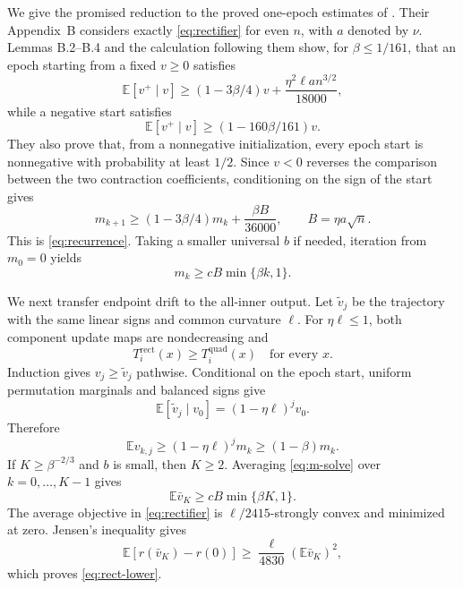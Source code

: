 \documentclass{article}
\theoremstyle{remark}
\newcommand{\E}{\mathbb E}
\newcommand{\1}{\mathbf 1}
\begin{document}
We give the promised reduction to the proved one-epoch estimates of \citet{cha2023tighter}. Their Appendix~B considers exactly \eqref{eq:rectifier} for even $n$, with $a$ denoted by $\nu$. Lemmas B.2--B.4 and the calculation following them show, for $\beta\leq1/161$, that an epoch starting from a fixed $v\geq0$ satisfies
\begin{equation}
 \E[v^+\mid v]
 \geq(1-3\beta/4)v+\frac{\eta^2\ell a n^{3/2}}{18000},
                                                               \label{eq:cha-pos}
\end{equation}
while a negative start satisfies
\begin{equation}
 \E[v^+\mid v]\geq(1-160\beta/161)v.                  \label{eq:cha-neg}
\end{equation}
They also prove that, from a nonnegative initialization, every epoch start is nonnegative with probability at least $1/2$. Since $v<0$ reverses the comparison between the two contraction coefficients, conditioning on the sign of the start gives
\begin{equation}
 m_{k+1}\geq(1-3\beta/4)m_k+\frac{\beta B}{36000},
 \qquad B=\eta a\sqrt n.                              \label{eq:m-exact}
\end{equation}
This is \eqref{eq:recurrence}. Taking a smaller universal $b$ if needed, iteration from $m_0=0$ yields
\begin{equation}
 m_k\geq cB\min\{\beta k,1\}.                         \label{eq:m-solve}
\end{equation}

We next transfer endpoint drift to the all-inner output. Let $\widetilde v_j$ be the trajectory with the same linear signs and common curvature $\ell$. For $\eta\ell\leq1$, both component update maps are nondecreasing and \[ T_i^{\mathrm{rect}}(x)\geq T_i^{\mathrm{quad}}(x) \quad\text{for every }x. \] Induction gives $v_j\geq\widetilde v_j$ pathwise. Conditional on the epoch start, uniform permutation marginals and balanced signs give \[ \E[\widetilde v_j\mid v_0]=(1-\eta\ell)^jv_0. \] Therefore \[ \E v_{k,j}\geq(1-\eta\ell)^jm_k\geq(1-\beta)m_k. \] If $K\geq\beta^{-2/3}$ and $b$ is small, then $K\geq2$. Averaging \eqref{eq:m-solve} over $k=0,\ldots,K-1$ gives
\begin{equation}
 \E\bar v_K\geq cB\min\{\beta K,1\}.                 \label{eq:mean-all}
\end{equation}
The average objective in \eqref{eq:rectifier} is $\ell/2415$-strongly convex and minimized at zero. Jensen's inequality gives \[ \E[r(\bar v_K)-r(0)] \geq\frac\ell{4830}(\E\bar v_K)^2, \] which proves \eqref{eq:rect-lower}.
\end{document}
